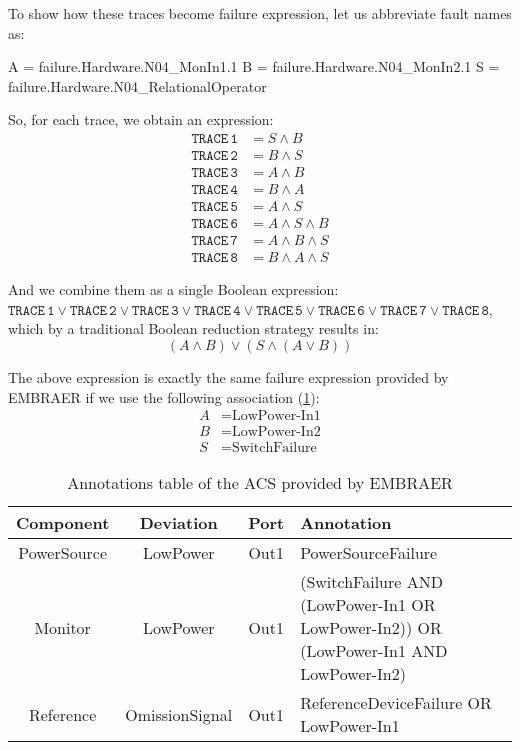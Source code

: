 \documentclass[12pt,openright,twoside,a4paper,oldfontcommands,english,brazil,final]{abntex2}
\theoremstyle{theo}
\newcommand{\EMBRAER}{EMBRAER\xspace}
\newenvironment{snippetcspm}[1][2]
{
\ifthenelse{\equal{#1}{0}}
    {\tiny}
    {
    \ifthenelse{\equal{#1}{1}}
        {\scriptsize}
        {
        \ifthenelse{\equal{#1}{2}}
            {\footnotesize}
            {\small}
        }
    }
\verbatim
}
{
\endverbatim
}
\begin{document}

To show how these traces become failure expression, let us abbreviate fault names as:
%
\begin{snippetcspm}[2]
A = failure.Hardware.N04_MonIn1.1
B = failure.Hardware.N04_MonIn2.1
S = failure.Hardware.N04_RelationalOperator
\end{snippetcspm}
%
So, for each trace, we obtain an expression:
\begin{align*}
\mathtt{TRACE\,1} &= S \land B\\
\mathtt{TRACE\,2} &= B \land S\\
\mathtt{TRACE\,3} &= A \land B\\
\mathtt{TRACE\,4} &= B \land A\\
\mathtt{TRACE\,5} &= A \land S\\
\mathtt{TRACE\,6} &= A \land S \land B\\
\mathtt{TRACE\,7} &= A \land B \land S\\
\mathtt{TRACE\,8} &= B \land A \land S
\end{align*}

And we combine them as a single Boolean expression:
%
$\mathtt{TRACE\,1} \lor \mathtt{TRACE\,2} \lor \mathtt{TRACE\,3} \lor \mathtt{TRACE\,4} \lor \mathtt{TRACE\,5} \lor \mathtt{TRACE\,6} \lor \mathtt{TRACE\,7} \lor \mathtt{TRACE\,8}$, %
which by a traditional Boolean reduction strategy results in:
%
\[(A \land B) \lor (S \land (A \lor B))\]

\begin{sloppypar}
The above expression is exactly the same failure expression provided by \EMBRAER if we use the following association (\cref{tbl:acsAnnotations}):
\begin{align*}
A &= \text{LowPower-In1}\\
B &= \text{LowPower-In2}\\
S &= \text{SwitchFailure}
\end{align*}
\end{sloppypar}

\begin{table}[t]
\renewcommand{\arraystretch}{1.3}
\caption{Annotations table of the ACS provided by \EMBRAER}
\label{tbl:acsAnnotations}
\centering
\begin{tabularx}{\linewidth}{|c|c|c|X|}
\hline
\bfseries Component & \bfseries Deviation & \bfseries Port & \bfseries Annotation \\
\hline
PowerSource & LowPower & Out1 & PowerSourceFailure\\
\hline
Monitor & LowPower & Out1 & (SwitchFailure AND (LowPower-In1 OR LowPower-In2)) OR (LowPower-In1 AND LowPower-In2) \\
\hline
Reference & OmissionSignal & Out1 & ReferenceDeviceFailure OR LowPower-In1\\
\hline
\end{tabularx}
\end{table}
\end{document}
